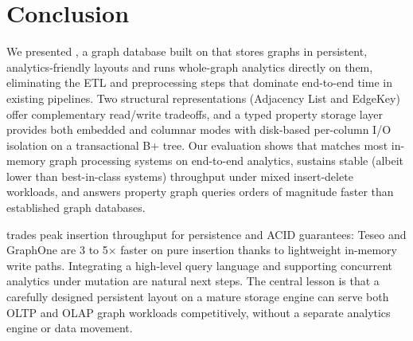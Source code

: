 \section{Conclusion}
\label{sec:conclusion}

We presented \project{}, a graph database built on \wt{} that stores graphs in persistent, analytics-friendly layouts and runs whole-graph analytics directly on them, eliminating the ETL and preprocessing steps that dominate end-to-end time in existing pipelines.
Two structural representations (Adjacency List and EdgeKey) offer complementary read/write tradeoffs, and a typed property storage layer provides both embedded and columnar modes with disk-based per-column I/O isolation on a transactional B+ tree.
Our evaluation shows that \project{} matches most in-memory graph processing systems on end-to-end analytics, sustains stable (albeit lower than best-in-class systems) throughput under mixed insert-delete workloads, and answers property graph queries orders of magnitude faster than established graph databases.

\project{} trades peak insertion throughput for persistence and ACID guarantees: Teseo and GraphOne are 3 to 5$\times$ faster on pure insertion thanks to lightweight in-memory write paths.
Integrating a high-level query language and supporting concurrent analytics under mutation are natural next steps.
The central lesson is that a carefully designed persistent layout on a mature storage engine can serve both OLTP and OLAP graph workloads competitively, without a separate analytics engine or data movement.